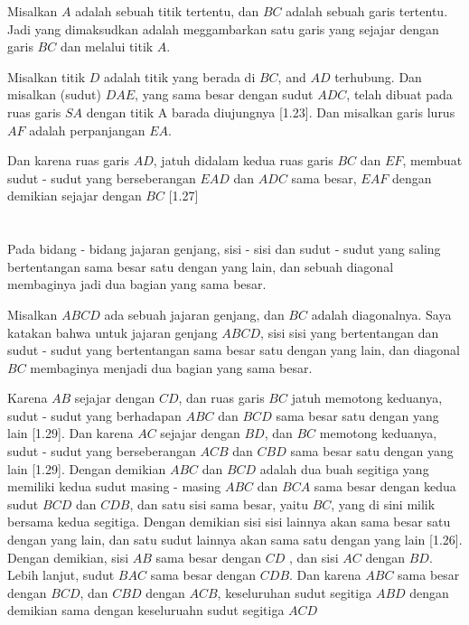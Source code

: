 \documentclass[a4paper]{book}
\begin{document}

Misalkan $A$ adalah sebuah titik tertentu, dan $BC$ adalah sebuah garis tertentu. Jadi
yang dimaksudkan adalah meggambarkan satu garis yang sejajar dengan garis $BC$ 
dan melalui titik $A$.

Misalkan titik $D$ adalah titik yang berada di $BC$, and $AD$ terhubung. 
Dan misalkan (sudut) $DAE$, yang sama besar dengan sudut $ADC$, telah dibuat 
pada ruas garis $SA$ dengan titik A barada diujungnya [1.23]. Dan misalkan garis
lurus $AF$ adalah perpanjangan $EA$.

Dan karena ruas garis $AD$, jatuh didalam  kedua ruas garis $BC$ dan $EF$, membuat 
sudut - sudut yang berseberangan $EAD$ dan $ADC$ sama besar, $EAF$ dengan demikian
sejajar dengan $BC$ [1.27] 

\setcounter{section}{34}
\section*{\centering \thesection} 
Pada bidang - bidang jajaran genjang, sisi - sisi dan sudut - sudut yang saling
bertentangan sama besar satu dengan yang lain, dan sebuah diagonal membaginya jadi dua bagian yang sama besar.  


Misalkan $ABCD$ ada sebuah jajaran genjang, dan $BC$ adalah diagonalnya. Saya katakan
bahwa untuk jajaran genjang $ABCD$, sisi sisi yang bertentangan dan sudut - sudut yang bertentangan
sama besar satu dengan yang lain, dan diagonal $BC$ membaginya menjadi dua bagian yang sama besar.

Karena $AB$ sejajar dengan $CD$, dan ruas garis $BC$ jatuh memotong keduanya, sudut - sudut yang 
berhadapan $ABC$ dan $BCD$ sama besar satu dengan yang lain [1.29]. Dan karena $AC$ sejajar dengan
$BD$, dan $BC$ memotong keduanya, sudut - sudut yang berseberangan $ACB$ dan $CBD$ sama besar satu 
dengan yang lain [1.29]. Dengan demikian $ABC$ dan $BCD$ adalah dua buah segitiga yang memiliki
kedua sudut masing - masing $ABC$ dan $BCA$ sama besar dengan kedua sudut $BCD$ dan $CDB$, dan satu 
sisi sama besar, yaitu $BC$, yang di sini milik bersama kedua segitiga.
Dengan demikian sisi sisi lainnya akan sama besar satu dengan yang lain, 
dan satu sudut lainnya akan sama satu dengan yang lain [1.26]. Dengan demikian, sisi $AB$ 
sama besar dengan $CD$ , dan sisi $AC$ dengan $BD$. Lebih lanjut, sudut $BAC$ sama besar
dengan $CDB$. Dan karena $ABC$ sama besar dengan $BCD$, dan $CBD$ dengan $ACB$, keseluruhan
sudut segitiga $ABD$ dengan demikian sama dengan keseluruahn  sudut segitiga $ACD$
\end{document}
